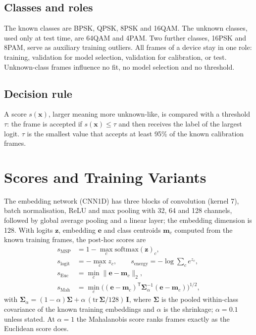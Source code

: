 \documentclass[journal]{IEEEtran}
\begin{document}
\subsection{Classes and roles}
The known classes are BPSK, QPSK, 8PSK and 16QAM. The unknown classes, used
only at test time, are 64QAM and 4PAM. Two further classes, 16PSK and 8PAM,
serve as auxiliary training outliers. All frames of a device stay in one
role: training, validation for model selection, validation for calibration,
or test. Unknown-class frames influence no fit, no model selection and no
threshold.

\subsection{Decision rule}
A score $s(\mathbf{x})$, larger meaning more unknown-like, is compared with a
threshold $\tau$: the frame is accepted if $s(\mathbf{x})\le\tau$ and then
receives the label of the largest logit. $\tau$ is the smallest value that
accepts at least 95\% of the known calibration frames.

\section{Scores and Training Variants}
The embedding network (CNN1D) has three blocks of convolution (kernel 7),
batch normalisation, ReLU and max pooling with 32, 64 and 128 channels,
followed by global average pooling and a linear layer; the embedding
dimension is 128. With logits $\mathbf{z}$, embedding $\mathbf{e}$ and class
centroids $\mathbf{m}_c$ computed from the known training frames, the
post-hoc scores are
\begin{align}
s_\mathrm{MSP} &= 1-\max_c \mathrm{softmax}(\mathbf{z})_c, \\
s_\mathrm{logit} &= -\max_c z_c, \qquad
s_\mathrm{energy} = -\log\textstyle\sum_c e^{z_c}, \\
s_\mathrm{Euc} &= \min_c \lVert \mathbf{e}-\mathbf{m}_c\rVert_2, \\
s_\mathrm{Mah} &= \min_c \bigl((\mathbf{e}-\mathbf{m}_c)^{\mathsf T}
\boldsymbol{\Sigma}_\alpha^{-1}(\mathbf{e}-\mathbf{m}_c)\bigr)^{1/2},
\end{align}
with $\boldsymbol{\Sigma}_\alpha=(1-\alpha)\boldsymbol{\Sigma}
+\alpha\,(\mathrm{tr}\,\boldsymbol{\Sigma}/128)\,\mathbf{I}$, where
$\boldsymbol{\Sigma}$ is the pooled within-class covariance of the known
training embeddings and $\alpha$ is the shrinkage; $\alpha=0.1$ unless
stated. At $\alpha=1$ the Mahalanobis score ranks frames exactly as the
Euclidean score does.
\end{document}
